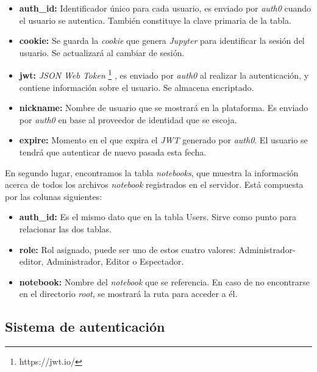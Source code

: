 \documentclass[11pt,spanish,listoffigures]{tfgetsinf}
\begin{document}
\begin{itemize}

\item \textbf{auth\_id:} Identificador único para cada usuario, es enviado por \textit{auth0} cuando el usuario se autentica. También constituye la clave primaria de la tabla.

\item \textbf{cookie:} Se guarda la \textit{cookie} que genera \textit{Jupyter} para identificar la sesión del usuario. Se actualizará al cambiar de sesión.

\item \textbf{jwt:} \textit{JSON Web Token} \footnote{https://jwt.io/} , es enviado por \textit{auth0} al realizar la autenticación, y contiene información sobre el usuario. Se almacena encriptado.

\item \textbf{nickname:} Nombre de usuario que se mostrará en la plataforma. Es enviado por \textit{auth0} en base al proveedor de identidad que se escoja.

\item \textbf{expire:} Momento en el que expira el \textit{\gls{JWT}} generado por \textit{auth0}. El usuario se tendrá que autenticar de nuevo pasada esta fecha.

\end{itemize}

En segundo lugar, encontramos la tabla \textit{notebooks}, que muestra la información acerca de todos los archivos \textit{notebook} registrados en el servidor. Está compuesta por las colunas siguientes:

\begin{itemize}

\item \textbf{auth\_id:} Es el mismo dato que en la tabla Users. Sirve como punto para relacionar las dos tablas. 

\item \textbf{role:} Rol asignado, puede ser uno de estos cuatro valores: Administrador-editor, Administrador, Editor o Espectador.

\item \textbf{notebook:} Nombre del \textit{notebook} que se referencia. En caso de no encontrarse en el directorio \textit{root}, se mostrará la ruta para acceder a él.

\end{itemize}


\subsection{Sistema de autenticación}
\label{subsec:diseno-auth}
\end{document}
